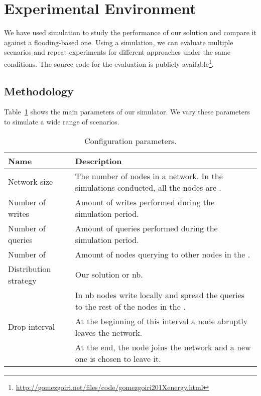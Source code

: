 \section{Experimental Environment}
\label{environment}
We have used simulation to study the performance of our solution and compare it against a flooding-based one.
Using a simulation, we can evaluate multiple scenarios and repeat experiments for different approaches under the same conditions.
The source code for the evaluation is publicly available\footnote{\url{http://gomezgoiri.net/files/code/gomezgoiri201Xenergy.html}}.

\subsection{Methodology}
Table~\ref{tab:configurationParameters} shows the main parameters of our simulator.
We vary these parameters to simulate a wide range of scenarios.


\begin{table}
  \centering
    \begin{tabular}{l p{7cm}}
      \hline
      Name & Description \\
      \hline
      Network size & The number of nodes in a network. In the simulations conducted, all the nodes are \providers{}. \\
      Number of writes & Amount of writes performed during the simulation period. \\
      Number of queries & Amount of queries performed during the simulation period. \\
      Number of \consumers{} & Amount of nodes querying to other nodes in the \Space{}. \\
      Distribution strategy & Our solution or \ac{nb}. \\
      & In \ac{nb} nodes write locally and spread the queries to the rest of the nodes in the \Space{}. \\
      Drop interval & At the beginning of this interval a node abruptly leaves the network. \\
      & At the end, the node joins the network and a new one is chosen to leave it. \\
      \hline
    \end{tabular}
    \caption {Configuration parameters.}
  \label{tab:configurationParameters}
\end{table}

